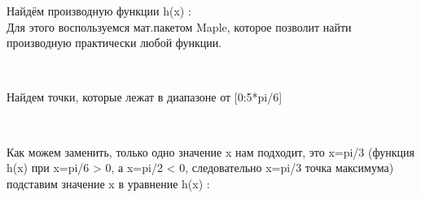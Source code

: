 \documentclass[russian,utf8,nocolumnxxxi,nocolumnxxxii]{eskdtext}
\begin{document}
Найдём производную функции h(x) :\\
Для этого воспользуемся мат.пакетом Maple, которое позволит найти производную практически любой функции.\\

\begin{figure}[H]
\begin{center}
\begin{minipage}[h]{0.65\linewidth}
  \\
\end{minipage}
\end{center}
\end{figure}

Найдем точки, которые лежат в диапазоне от [0:5*pi/6]\\

\begin{figure}[H]
\begin{center}
\begin{minipage}[h]{0.65\linewidth}
  \\
\end{minipage}
\end{center}
\end{figure}
\newpage

Как можем заменить, только одно значение x нам подходит, это x=pi/3 (функция h(x) при x=pi/6 > 0, а x=pi/2 < 0, следовательно x=pi/3 точка максимума) \\
подставим значение x в уравнение h(x) :
\end{document}

